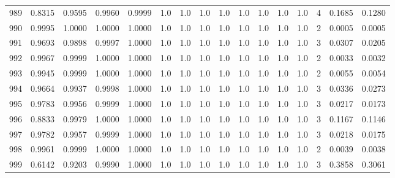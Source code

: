 \begin{tabular}{lrrrrrrrrrrrrrrr}
989 &      0.8315 &  0.9595 &  0.9960 &  0.9999 &     1.0 &     1.0 &     1.0 &     1.0 &     1.0 &     1.0 &      1.0 &        1.0 &      4 &                    0.1685 &                     0.1280 \\
990 &      0.9995 &  1.0000 &  1.0000 &  1.0000 &     1.0 &     1.0 &     1.0 &     1.0 &     1.0 &     1.0 &      1.0 &        1.0 &      2 &                    0.0005 &                     0.0005 \\
991 &      0.9693 &  0.9898 &  0.9997 &  1.0000 &     1.0 &     1.0 &     1.0 &     1.0 &     1.0 &     1.0 &      1.0 &        1.0 &      3 &                    0.0307 &                     0.0205 \\
992 &      0.9967 &  0.9999 &  1.0000 &  1.0000 &     1.0 &     1.0 &     1.0 &     1.0 &     1.0 &     1.0 &      1.0 &        1.0 &      2 &                    0.0033 &                     0.0032 \\
993 &      0.9945 &  0.9999 &  1.0000 &  1.0000 &     1.0 &     1.0 &     1.0 &     1.0 &     1.0 &     1.0 &      1.0 &        1.0 &      2 &                    0.0055 &                     0.0054 \\
994 &      0.9664 &  0.9937 &  0.9998 &  1.0000 &     1.0 &     1.0 &     1.0 &     1.0 &     1.0 &     1.0 &      1.0 &        1.0 &      3 &                    0.0336 &                     0.0273 \\
995 &      0.9783 &  0.9956 &  0.9999 &  1.0000 &     1.0 &     1.0 &     1.0 &     1.0 &     1.0 &     1.0 &      1.0 &        1.0 &      3 &                    0.0217 &                     0.0173 \\
996 &      0.8833 &  0.9979 &  1.0000 &  1.0000 &     1.0 &     1.0 &     1.0 &     1.0 &     1.0 &     1.0 &      1.0 &        1.0 &      3 &                    0.1167 &                     0.1146 \\
997 &      0.9782 &  0.9957 &  0.9999 &  1.0000 &     1.0 &     1.0 &     1.0 &     1.0 &     1.0 &     1.0 &      1.0 &        1.0 &      3 &                    0.0218 &                     0.0175 \\
998 &      0.9961 &  0.9999 &  1.0000 &  1.0000 &     1.0 &     1.0 &     1.0 &     1.0 &     1.0 &     1.0 &      1.0 &        1.0 &      2 &                    0.0039 &                     0.0038 \\
999 &      0.6142 &  0.9203 &  0.9990 &  1.0000 &     1.0 &     1.0 &     1.0 &     1.0 &     1.0 &     1.0 &      1.0 &        1.0 &      3 &                    0.3858 &                     0.3061 \\
\bottomrule
\end{tabular}
